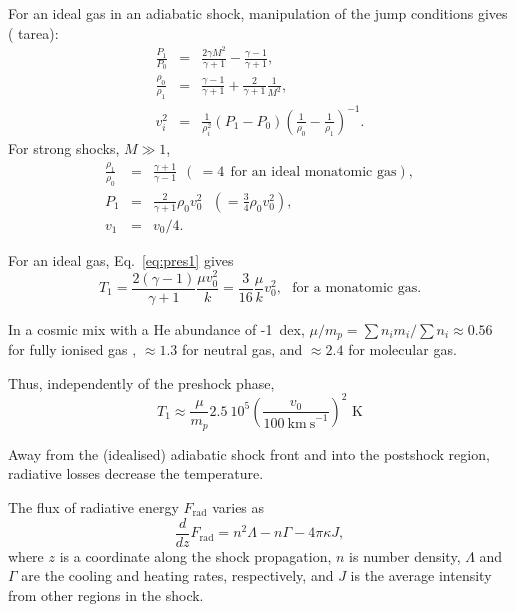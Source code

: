 
For an ideal gas in an adiabatic shock, manipulation of the jump
conditions gives ({\color{red} tarea}):
\begin{eqnarray}
\frac{P_1}{P_0} & = & \frac{2\gamma M^2}{\gamma + 1} - \frac{\gamma -
  1}{\gamma +1}, \\
\frac{\rho_0}{\rho_1} & = & \frac{\gamma -
  1}{\gamma +1} + \frac{2}{\gamma + 1} \frac{1}{M^2}, \label{eq:dens} \\ 
v_i^2  & = & \frac{1}{\rho_i^2} (P_1 - P_0) \left(\frac{1}{\rho_0} - \frac{1}{\rho_1}\right)^{-1}.  
\end{eqnarray}
For strong shocks, $M \gg 1$, 
\begin{eqnarray}
\frac{\rho_1}{\rho_0} & = & \frac{\gamma + 1 }{\gamma -1 } ~~(~= 4~~
\text{for an ideal monatomic gas}), \label{eq:Jshock1} \\
P_1 & = & \frac{2}{\gamma + 1} \rho_0 v_0^2 ~~~( = \frac{3}{4} \rho_0
v_0^2), \label{eq:pres1}\\ 
v_1 & = & v_0 /4. \label{eq:Jshock2}
\end{eqnarray}


For an ideal gas, Eq.~\ref{eq:pres1} gives 
\[T_1 = \frac{2 (\gamma - 1)
}{\gamma + 1} \frac{\mu v_0^2}{k} = \frac{3}{16} \frac{\mu}{k}
v_0^2,~~~{\text{for a monatomic gas}}.\] 


In a cosmic mix with a He abundance of -1~dex, $\mu / m_p = \sum n_i
m_i / \sum n_i \approx 0.56$ for fully ionised gas , $\approx 1.3$ for
neutral gas, and $\approx 2.4$ for molecular gas.


 Thus, independently
of the preshock phase,
\[ T_1 \approx \frac{\mu}{m_p} 2.5~10^{5} \left(
\frac{v_0}{100~\mathrm{km~s}^{-1}} \right)^2 \text{~K} \]



Away from the (idealised) adiabatic shock front and into the postshock
region, radiative losses decrease the temperature. 

The flux of radiative energy $F_\mathrm{rad}$ varies as
\[ \frac{d}{dz}F_\mathrm{rad} = n^2\Lambda  - n \Gamma  - 4 \pi \kappa
J, \]
where $z$ is a coordinate along the shock propagation, $n$ is number
density, $\Lambda$ and $\Gamma$ are the cooling and heating rates,
respectively, and $J$ is the average intensity from other regions in
the shock. 

